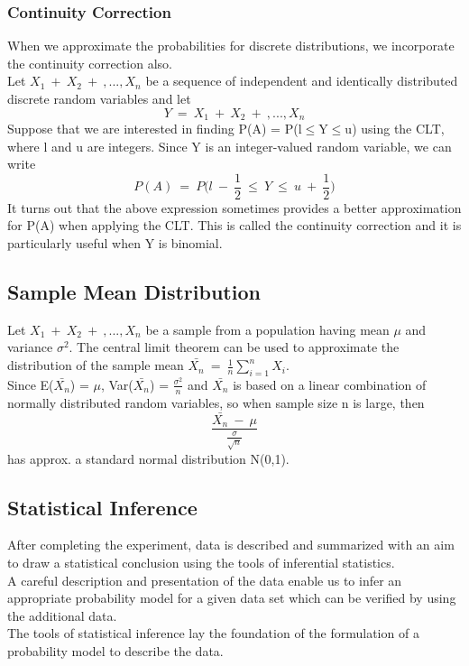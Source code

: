 \subsubsection*{Continuity Correction}
When we approximate the probabilities for discrete distributions,
we incorporate the continuity correction also.\\
Let $X_1\ +\ X_2\ +\ ,..., X_n$ be a sequence of independent and identically distributed discrete random variables and let
\[ Y\ =\ X_1\ +\ X_2\ +\ ,..., X_n\]
Suppose that we are interested in finding P(A) = P(l$\leq$Y$\leq$u) using the CLT, where l and u are integers. Since Y is an integer{-}valued random variable, we can write
\[
P(A)\ =\ P\Bigg(l\ -\ \frac{1}{2}\ \leq\ Y\ \leq\ u\ +\ \frac{1}{2}\Bigg)
\]
It turns out that the above expression sometimes provides a better approximation for P(A) when applying the CLT. This is called the continuity correction and it is particularly useful when Y is binomial.

\subsection*{Sample Mean Distribution}
Let $X_1\ +\ X_2\ +\ ,..., X_n$ be a sample from a population having mean $\mu$ and variance $\sigma^2$. The central limit theorem can be used to approximate the distribution of the sample mean
$\bar{X_n}\ =\ \frac{1}{n}\sum_{i=1}^{n}X_i$.\\
Since E($\bar{X_n}$) = $\mu$, Var($\bar{X_n}$) = $\frac{\sigma^2}{n}$ and $\bar{X_n}$ is based on a linear combination of normally distributed random variables, so when sample size n is large, then
\[ \frac{\bar{X_n}\ -\ \mu}{\frac{\sigma}{\sqrt{n}}} \]
has approx. a standard normal distribution N(0,1).

\subsection*{Statistical Inference}
After completing the experiment, data is described and
summarized with an aim to draw a statistical conclusion using the
tools of inferential statistics.\\
A careful description and presentation of the data enable us to
infer an appropriate probability model for a given data set which
can be verified by using the additional data.\\
The tools of statistical inference lay the foundation of the
formulation of a probability model to describe the data.

